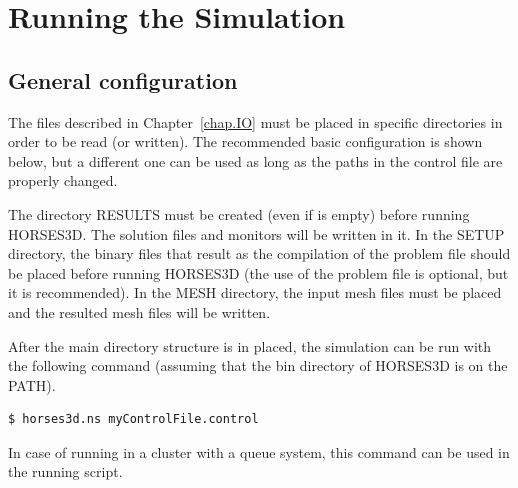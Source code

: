 \documentclass[a4paper,10pt]{report}
\begin{document}

\chapter{Running the Simulation}

\section{General configuration}
The files described in Chapter~\ref{chap.IO} must be placed in specific directories in order to be read (or written). The recommended basic configuration is shown below, but a different one can be used as long as the paths in the control file are properly changed.

\vspace{0.2 in}

\vspace{0.2 in}
The directory RESULTS must be created (even if is empty) before running HORSES3D. The solution files and monitors will be written in it. In the SETUP directory, the binary files that result as the compilation of the problem file should be placed before running HORSES3D (the use of the problem file is optional, but it is recommended). In the MESH directory, the input mesh files must be placed and the resulted mesh files will be written.

After the main directory structure is in placed, the simulation can be run with the following command (assuming that the bin directory of HORSES3D is on the PATH).

\begin{lstlisting}[language=bash]
	$ horses3d.ns myControlFile.control
\end{lstlisting}

In case of running in a cluster with a queue system, this command can be used in the running script.


\end{document}
